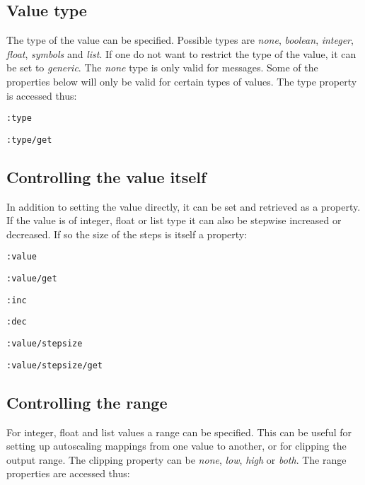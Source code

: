 \documentclass{sig-alternate}
\begin{document}

\subsection{Value type} %
\label{sub:type}

The type of the value can be specified. Possible types are \emph{none}, \emph{boolean}, \emph{integer}, \emph{float}, \emph{symbols} and \emph{list}. If one do not want to restrict the type of the value, it can be set to \emph{generic}. The \emph{none} type is only valid for messages. Some of the properties below will only be valid for certain types of values. The type property is accessed thus:

\texttt{:type}

\texttt{:type/get}





\subsection{Controlling the value itself} %
\label{sub:controlling_the_value_itself}

In addition to setting the value directly, it can be set and retrieved as a property. If the value is of integer, float or list type it can also be stepwise increased or decreased. If so the size of the steps is itself a property:

\texttt{:value}

\texttt{:value/get}

\texttt{:inc}

\texttt{:dec} 

\texttt{:value/stepsize}

\texttt{:value/stepsize/get}





\subsection{Controlling the range} %
\label{sub:range}

For integer, float and list values a range can be specified. This can be useful for setting up autoscaling mappings from one value to another, or for clipping the output range. The clipping property can be \emph{none}, \emph{low}, \emph{high} or \emph{both}. The range properties are accessed thus:
\end{document}
